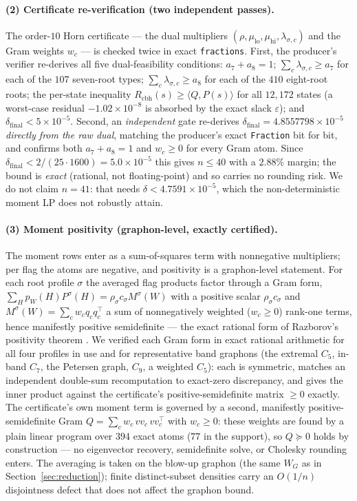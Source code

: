 \documentclass[11pt]{article}
\theoremstyle{remark}
\begin{document}
\paragraph{(2) Certificate re-verification (two independent passes).} The order-$10$
Horn certificate --- the dual multipliers $(\rho,\mu_{\mathrm{lo}},\mu_{\mathrm{hi}},
\lambda_{\sigma,c})$ and the Gram weights $w_c$ --- is checked twice in exact
\texttt{fractions}. First, the producer's verifier re-derives all five
dual-feasibility conditions: $a_7+a_8=1$; $\sum_c\lambda_{\sigma,c}\ge a_7$ for each
of the $107$ seven-root types; $\sum_c\lambda_{\sigma,c}\ge a_8$ for each of the $410$
eight-root roots; the per-state inequality $R_{\mathrm{cbh}}(s)\ge\langle Q,P(s)\rangle$
for all $12{,}172$ states (a worst-case residual $-1.02\times10^{-8}$ is absorbed by
the exact slack $\varepsilon$); and $\delta_{\mathrm{final}}<5\times10^{-5}$. Second,
an \emph{independent} gate re-derives
$\delta_{\mathrm{final}}=4.8557798\times10^{-5}$ \emph{directly from the raw dual},
matching the producer's exact \texttt{Fraction} bit for bit, and confirms both
$a_7+a_8=1$ and $w_c\ge0$ for every Gram atom. Since
$\delta_{\mathrm{final}}<2/(25\cdot 1600)=5.0\times10^{-5}$ this gives $n\le 40$ with a
$2.88\%$ margin; the bound is \emph{exact} (rational, not floating-point) and so
carries no rounding risk. We do not claim $n=41$: that needs
$\delta<4.7591\times10^{-5}$, which the non-deterministic moment LP does not robustly
attain.

\paragraph{(3) Moment positivity (graphon-level, exactly certified).} The moment
rows enter as a sum-of-squares term with nonnegative multipliers; per flag the
atoms are negative, and positivity is a graphon-level statement. For each root
profile $\sigma$ the averaged flag products factor through a Gram form,
$\sum_H p_W(H)P^\sigma(H)=\rho_\sigma c_\sigma M^\sigma(W)$ with a positive scalar
$\rho_\sigma c_\sigma$ and $M^\sigma(W)=\sum_c w_c q_c q_c^\top$ a sum of
nonnegatively weighted ($w_c\ge0$) rank-one terms, hence manifestly positive
semidefinite --- the exact rational form of Razborov's positivity theorem
\cite{Raz07}. We verified each Gram form in exact rational arithmetic for all four
profiles in use and for representative band graphons (the extremal $C_5$, in-band
$C_7$, the Petersen graph, $C_9$, a weighted $C_5$): each is symmetric, matches an
independent double-sum recomputation to exact-zero discrepancy, and gives the
inner product against the certificate's positive-semidefinite matrix
$\ge 0$ exactly. The certificate's own moment term is governed by a second,
manifestly positive-semidefinite Gram $Q=\sum_c w_c\,vv_c\,vv_c^\top$ with $w_c\ge0$:
these weights are found by a plain linear program over $394$ exact atoms ($77$ in the
support), so $Q\succeq0$ holds by construction --- no eigenvector recovery,
semidefinite solve, or Cholesky rounding enters. The averaging is taken on the
blow-up graphon (the same $W_G$ as in Section~\ref{sec:reduction}); finite
distinct-subset densities carry an $O(1/n)$ disjointness defect that does not affect
the graphon bound.
\end{document}
